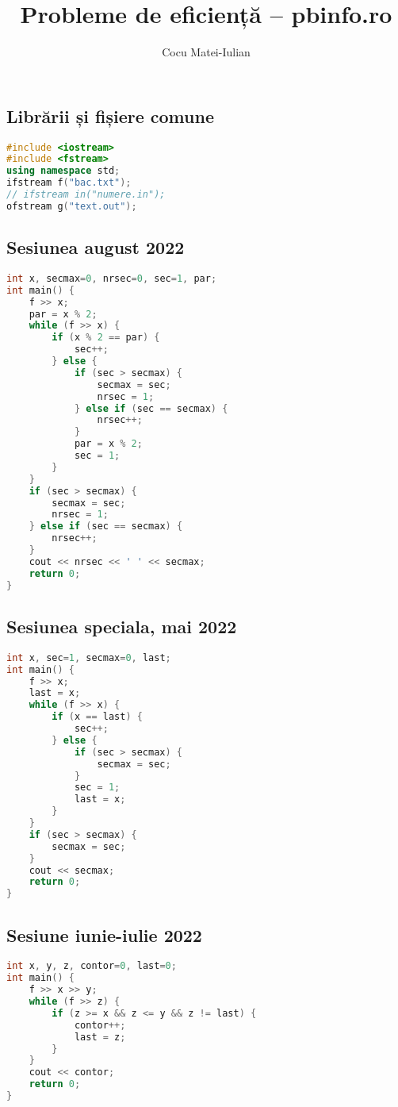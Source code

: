 \documentclass[10pt, a4paper, twocolumn]{article}
\title{\textbf{Probleme de eficiență – pbinfo.ro}}
\author{Cocu Matei-Iulian}
\date{}
\begin{document}
\maketitle

\subsection*{Librării și fișiere comune}
\begin{lstlisting}[language=C++]
#include <iostream>
#include <fstream>
using namespace std;
ifstream f("bac.txt");
// ifstream in("numere.in");
ofstream g("text.out");
\end{lstlisting}
\vspace{0.5cm}

\subsection*{Sesiunea august 2022}
\begin{lstlisting}[language=C++]
int x, secmax=0, nrsec=0, sec=1, par;
int main() {
    f >> x;
    par = x % 2;
    while (f >> x) {
        if (x % 2 == par) {
            sec++;
        } else {
            if (sec > secmax) {
                secmax = sec;
                nrsec = 1;
            } else if (sec == secmax) {
                nrsec++;
            }
            par = x % 2;
            sec = 1;
        }
    }
    if (sec > secmax) {
        secmax = sec;
        nrsec = 1;
    } else if (sec == secmax) {
        nrsec++;
    }
    cout << nrsec << ' ' << secmax;
    return 0;
}
\end{lstlisting}
\vspace{0.5cm}

\subsection*{Sesiunea speciala, mai 2022}
\begin{lstlisting}[language=C++]
int x, sec=1, secmax=0, last;
int main() {
    f >> x;
    last = x;
    while (f >> x) {
        if (x == last) {
            sec++;
        } else {
            if (sec > secmax) {
                secmax = sec;
            }
            sec = 1;
            last = x;
        }
    }
    if (sec > secmax) {
        secmax = sec;
    }
    cout << secmax;
    return 0;
}
\end{lstlisting}
\vspace{0.5cm}

\subsection*{Sesiune iunie-iulie 2022}
\begin{lstlisting}[language=C++]
int x, y, z, contor=0, last=0;
int main() {
    f >> x >> y;
    while (f >> z) {
        if (z >= x && z <= y && z != last) {
            contor++;
            last = z;
        }
    }
    cout << contor;
    return 0;
}
\end{lstlisting}
\vspace{0.5cm}
\end{document}

